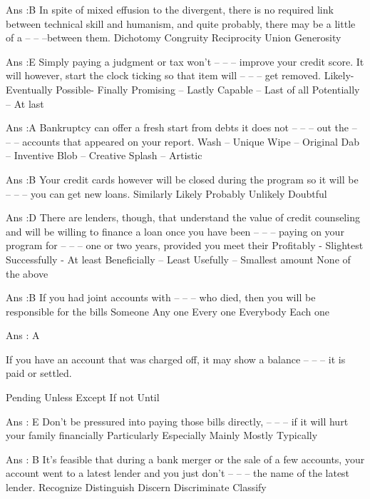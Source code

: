     Ans :B
    In spite of mixed effusion to the divergent, there is no required link between technical skill and humanism, and quite probably, there may be a little of a -- -- --between them.
        Dichotomy
        Congruity
        Reciprocity
        Union
        Generosity 

    Ans :E
    Simply paying a judgment or tax won’t -- -- -- improve your credit score. It will however, start the clock ticking so that item will -- -- -- get removed.
        Likely- Eventually
        Possible- Finally
        Promising – Lastly
        Capable – Last of all
        Potentially – At last 

    Ans :A
    Bankruptcy can offer a fresh start from debts it does not -- -- -- out the -- -- -- accounts that appeared on your report.
        Wash – Unique
        Wipe – Original
        Dab – Inventive
        Blob – Creative
        Splash – Artistic 

    Ans :B
    Your credit cards however will be closed during the program so it will be -- -- -- you can get new loans.
        Similarly
        Likely
        Probably
        Unlikely
        Doubtful 

    Ans :D
    There are lenders, though, that understand the value of credit counseling and will be willing to finance a loan once you have been -- -- -- paying on your program for -- -- -- one or two years, provided you meet their
        Profitably - Slightest
        Successfully - At least
        Beneficially – Least
        Usefully – Smallest amount
        None of the above 

    Ans :B
    If you had joint accounts with -- -- -- who died, then you will be responsible for the bills
        Someone
        Any one
        Every one
        Everybody
        Each one 

    Ans : A 




    If you have an account that was charged off, it may show a balance -- -- -- it is paid or settled.

        Pending
        Unless
        Except
        If not
        Until 

    Ans : E
    Don’t be pressured into paying those bills directly, -- -- -- if it will hurt your family financially
        Particularly
        Especially
        Mainly
        Mostly
        Typically 

    Ans : B
    It’s feasible that during a bank merger or the sale of a few accounts, your account went to a latest lender and you just don’t -- -- -- the name of the latest lender.
        Recognize
        Distinguish
        Discern
        Discriminate
        Classify 

